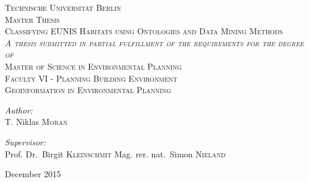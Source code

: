 \begin{titlepage}
\begin{center}

\textsc{\LARGE Technische Universit\"at Berlin}\\[0.5cm]
\textsc{Master Thesis}\\[1.5cm]

\textsc{\Large Classifying EUNIS Habitats using Ontologies and Data Mining
Methods}\\[1.5cm]
\textsc{\textit{A thesis submitted in partial fulfillment of the requirements
for the degree of}}\\[1.25cm]
\textsc{\Large Master of Science in Environmental Planning}\\[1.5cm]
\textsc{Faculty VI - Planning Building Environment\\
 Geoinformation in Environmental Planning}\\[1.5cm]

\noindent
\begin{minipage}{0.5\textwidth}
\begin{flushleft} \large
\emph{Author:}\\
T. Niklas \textsc{Moran}
\end{flushleft}
\end{minipage}%
\begin{minipage}{0.5\textwidth}
\begin{flushright} \large
\emph{Supervisor:} \\
Prof. Dr.~Birgit \textsc{Kleinschmit}
Mag. rer. nat.~Simon \textsc{Nieland}
\end{flushright}
\end{minipage}

\vfill

{\large December 2015}

\end{center}
\end{titlepage}